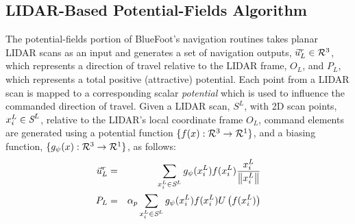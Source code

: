 		\subsection{LIDAR-Based Potential-Fields Algorithm}

			The potential-fields portion of BlueFoot's navigation routines takes planar LIDAR scans as an input and generates a set of navigation outputs, $\vec{u}^{r}_{L} \in {\cal R}^{3}$, which represents a direction of travel relative to the LIDAR frame, $O_{L}$, and $P_{L}$, which represents a total positive (attractive) potential. Each point from a LIDAR scan is mapped to a corresponding scalar \emph{potential} which is used to influence the commanded direction of travel. Given a LIDAR scan, $S^{L}$, with 2D scan points, $x_{i}^{L}\in\emph{S}^{L}$, relative to the LIDAR's local coordinate frame $O_{L}$, command elements are generated using a potential function $\{ f(x) : {\cal R}^{3}\rightarrow {\cal R}^{1} \}$, and a biasing function, $\{ g_{\psi}(x) : {\cal R}^{3}\rightarrow {\cal R}^{1} \}$, as follows:
				\begin{eqnarray}
					\vec{u}^{r}_{L} &=&  { \sum_{x_{i}^{L} \in \emph{S}^{L}} g_{\psi}(x_{i}^{L})  f( x_{i}^{L} ) \frac{x_{i}^{L}}{\left\lVert x_{i}^{L}\right\rVert} } \nonumber \\
					P_{L} & = & \alpha_{p}\sum_{x_{i}^{L} \in \emph{S}^{L}} g_{\psi}(x_{i}^{L})  f( x_{i}^{L} ) U\left(f( x_{i}^{L} )\right)
					\label{eq::full_potential_fields}
				\end{eqnarray}

